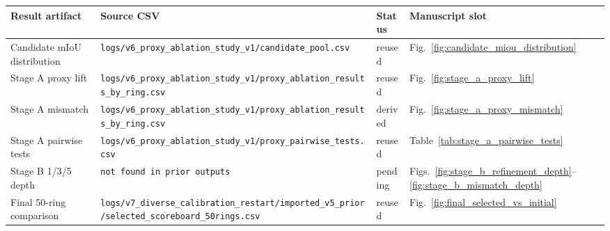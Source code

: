 \begin{tabular}{p{}p{}p{}p{}}
\toprule
Result artifact & Source CSV & Status & Manuscript slot \\
\midrule
Candidate mIoU distribution & \texttt{logs/v6\_proxy\_ablation\_study\_v1/candidate\_pool.csv} & reused & Fig.~\ref{fig:candidate_miou_distribution} \\
Stage A proxy lift & \texttt{logs/v6\_proxy\_ablation\_study\_v1/proxy\_ablation\_results\_by\_ring.csv} & reused & Fig.~\ref{fig:stage_a_proxy_lift} \\
Stage A mismatch & \texttt{logs/v6\_proxy\_ablation\_study\_v1/proxy\_ablation\_results\_by\_ring.csv} & derived & Fig.~\ref{fig:stage_a_proxy_mismatch} \\
Stage A pairwise tests & \texttt{logs/v6\_proxy\_ablation\_study\_v1/proxy\_pairwise\_tests.csv} & reused & Table~\ref{tab:stage_a_pairwise_tests} \\
Stage B 1/3/5 depth & \texttt{not found in prior outputs} & pending & Figs.~\ref{fig:stage_b_refinement_depth}--\ref{fig:stage_b_mismatch_depth} \\
Final 50-ring comparison & \texttt{logs/v7\_diverse\_calibration\_restart/imported\_v5\_prior/selected\_scoreboard\_50rings.csv} & reused & Fig.~\ref{fig:final_selected_vs_initial} \\
\bottomrule
\end{tabular}
